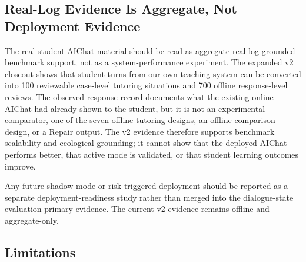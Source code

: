 \documentclass[11pt]{article}
\begin{document}
\subsection{Real-Log Evidence Is Aggregate, Not Deployment Evidence}

The real-student AIChat material should be read as aggregate real-log-grounded benchmark support, not as a system-performance experiment. The expanded v2 closeout shows that student turns from our own teaching system can be converted into 100 reviewable case-level tutoring situations and 700 offline response-level reviews. The observed response record documents what the existing online AIChat had already shown to the student, but it is not an experimental comparator, one of the seven offline tutoring designs, an offline comparison design, or a Repair output. The v2 evidence therefore supports benchmark scalability and ecological grounding; it cannot show that the deployed AIChat performs better, that active mode is validated, or that student learning outcomes improve.

Any future shadow-mode or risk-triggered deployment should be reported as a separate deployment-readiness study rather than merged into the dialogue-state evaluation primary evidence. The current v2 evidence remains offline and aggregate-only.

\subsection{Limitations}
\end{document}
